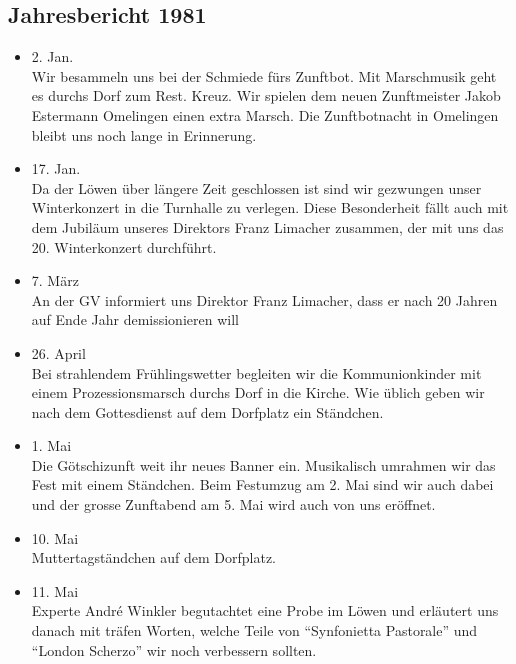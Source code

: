 \subsection{Jahresbericht 1981}

\begin{history}


    \begin{itemize}

        \item[]2. Jan.\\
        Wir besammeln uns bei der Schmiede fürs Zunftbot. Mit Marschmusik geht
        es durchs Dorf zum Rest. Kreuz. Wir spielen dem neuen Zunftmeister Jakob
        Estermann Omelingen einen extra Marsch. Die Zunftbotnacht in Omelingen
        bleibt uns noch lange in Erinnerung.

        \item[]17. Jan.\\
        Da der Löwen über längere Zeit geschlossen ist sind wir gezwungen unser
        Winterkonzert in die Turnhalle zu verlegen. Diese Besonderheit fällt
        auch mit dem Jubiläum unseres Direktors Franz Limacher zusammen, der mit
        uns das 20. Winterkonzert durchführt.

        \item[]7. März\\
        An der GV informiert uns Direktor Franz Limacher, dass er nach 20 Jahren
        auf Ende Jahr demissionieren will

        \item[]26. April\\
        Bei strahlendem Frühlingswetter begleiten wir die Kommunionkinder mit
        einem Prozessionsmarsch durchs Dorf in die Kirche. Wie üblich geben wir
        nach dem Gottesdienst auf dem Dorfplatz ein Ständchen.

        \item[]1. Mai\\
        Die Götschizunft weit ihr neues Banner ein. Musikalisch umrahmen wir das
        Fest mit einem Ständchen. Beim Festumzug am 2. Mai sind wir auch dabei
        und der grosse Zunftabend am 5. Mai wird auch von uns eröffnet.

        \item[]10. Mai\\
        Muttertagständchen auf dem Dorfplatz.

        \item[]11. Mai\\
        Experte André Winkler begutachtet eine Probe im Löwen und erläutert uns
        danach mit träfen Worten, welche Teile von \enquote{Synfonietta Pastorale} und
        \enquote{London Scherzo} wir noch verbessern sollten.


\end{itemize}
\end{history}
